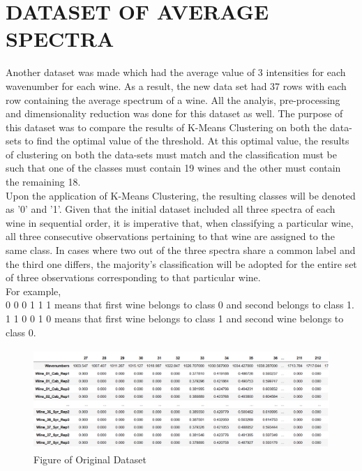 \documentclass{article}
\begin{document}
\section{DATASET OF AVERAGE SPECTRA}\label{sec:rule}
Another dataset was made which had the average value of 3 intensities for each wavenumber for each wine. As a result, the new data set had 37 rows with each row containing the average spectrum of a wine. All the analyis, pre-processing and dimensionality reduction was done for this dataset as well. The purpose of this dataset was to compare the results of K-Means Clustering on both the data-sets to find the optimal value of the threshold. At this optimal value, the results of clustering on both the data-sets must match and the classification must be such that one of the classes must contain 19 wines and the other must contain the remaining 18.\\
\newline
Upon the application of K-Means Clustering, the resulting classes will be denoted as '0' and '1'. Given that the initial dataset included all three spectra of each wine in sequential order, it is imperative that, when classifying a particular wine, all three consecutive observations pertaining to that wine are assigned to the same class. In cases where two out of the three spectra share a common label and the third one differs, the majority's classification will be adopted for the entire set of three observations corresponding to that particular wine.\\
\newline
For example,\\
0 0 0 1 1 1 means that first wine belongs to class 0 and second belongs to class 1.\\
1 1 0 0 1 0 means that first wine belongs to class 1 and second wine belongs to class 0.\\
\begin{figure}[H]
	\centering 
	\includegraphics[height=1.5in]{Original Dataset.png}
	\caption[Optional Caption]{Figure of Original Dataset}
	\label{fig:fig3}
\end{figure}
\end{document}
